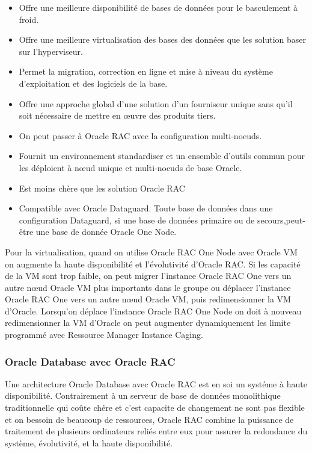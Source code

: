 \documentclass[12pt]{report}
\begin{document}
\begin{itemize}
\item Offre une meilleure disponibilité de bases de données pour le basculement
  à  froid.
\item Offre une meilleure virtualisation des bases des données que les solution
  baser sur l'hyperviseur.
\item Permet la migration, correction en ligne et mise à niveau du système
  d'exploitation et des logiciels de la base.
\item Offre une approche global d'une solution d'un fourniseur unique sans qu'il
  soit nécessaire de mettre en œuvre des produits tiers.
\item On peut passer à Oracle RAC avec la configuration multi-noeuds.
\item Fournit un environnement standardiser et un ensemble d'outils commun pour
  les déploient à nœud unique et multi-noeuds de base Oracle.
\item Est moins chère que les solution Oracle RAC
\item Compatible avec Oracle Dataguard. Toute base de données dans une
  configuration Dataguard, si une base de données primaire ou de
  secours,peut-être une base de donnée Oracle One Node.
\end{itemize}
\vspace{1cm}

	Pour la virtualisation, quand on utilise Oracle RAC One Node avec Oracle VM on
  augmente la haute disponibilité et l'évolutivité d'Oracle RAC. Si les capacité
  de la VM  sont trop faible, on peut migrer l'instance Oracle RAC One  vers un
  autre nœud Oracle VM plus importants dans le groupe ou déplacer l'instance
  Oracle RAC One vers un autre nœud Oracle VM, puis redimensionner la VM
  d'Oracle. Lorsqu'on déplace l'instance Oracle RAC One Node on doit à nouveau
  redimensionner la VM d'Oracle on peut augmenter dynamiquement les limite
  programmé avec Ressource Manager Instance Caging.

\subsubsection{Oracle Database avec Oracle RAC}

Une architecture Oracle Database avec Oracle RAC est en soi un systéme à haute
disponibilité. Contrairement à un serveur de base de données monolithique
traditionnelle qui coûte chére et c'est capacite de changement ne sont pas
flexible et on bessoin de beaucoup de ressources, Oracle RAC combine la
puissance de traitement de plusieurs ordinateurs reliés entre eux pour assurer
la redondance du système,  évolutivité, et la haute disponibilité. \\
\end{document}
